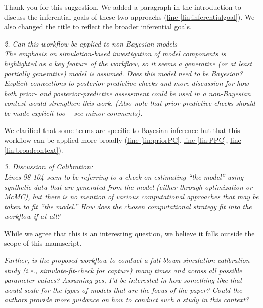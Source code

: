 \documentclass[11pt,letter]{article}
\begin{document}
Thank you for this suggestion. We added a paragraph in the introduction to discuss the inferential goals of these two approachs (\href{file:forecastflows_r1\#lintarget:inferentialgoal}{line \ref*{lin:inferentialgoal}}). We also changed the title to reflect the broader inferential goals.

\begin{mybox}
\emph{2. Can this workflow be applied to non-Bayesian models\\
The emphasis on simulation-based investigation of model components is highlighted as a key feature of
the workflow, so it seems a generative (or at least partially generative) model is assumed. Does this model need to be Bayesian? Explicit connections to posterior predictive checks and more discussion for how both prior- and posterior-predictive assessment could be used in a non-Bayesian context would strengthen this work. (Also note that prior predictive checks should be made explicit too – see minor comments).}
\end{mybox}

We clarified that some terms are specific to Bayesian inference but that this workflow can be applied more broadly (\href{file:forecastflows_r1\#lintarget:priorPC}{line \ref*{lin:priorPC}}, \href{file:forecastflows_r1\#lintarget:PPC}{line \ref*{lin:PPC}}, \href{file:forecastflows_r1\#lintarget:broadcontext}{line \ref*{lin:broadcontext}}).

\begin{mybox}
\emph{3. Discussion of Calibration:\\
Lines 98-104 seem to be referring to a check on estimating “the model” using synthetic data that are generated from the model (either through optimization or McMC), but there is no mention of various computational approaches that may be taken to fit “the model.” How does the chosen computational strategy fit into the workflow if at all?}
\end{mybox}

While we agree that this is an interesting question, we believe it falls outside the scope of this manuscript.

\begin{mybox}
\emph{Further, is the proposed workflow to conduct a full-blown simulation calibration study (i.e., simulate-fit-check for capture) many times and across all possible parameter values? Assuming yes, I’d be interested in how something like that would scale for the types of models that are the focus of the paper? Could the authors provide more guidance on how to conduct such a study in this context?}
\end{mybox}
\end{document}
